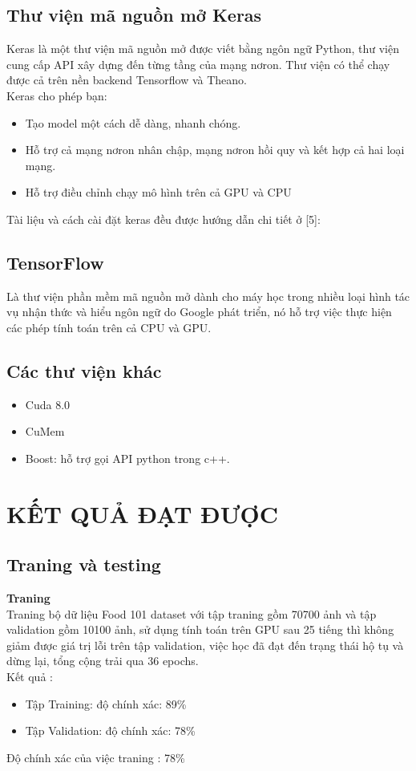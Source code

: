 \documentclass[13pt, a4paper]{extreport}
\begin{document}
\section{Thư viện mã nguồn mở Keras}
\indent Keras là một thư viện mã nguồn mở được viết bằng ngôn ngữ Python, thư viện cung cấp API xây dựng đến từng tầng của mạng nơron. Thư viện có thể chạy được cả trên nền backend Tensorflow và Theano.\\
\indent Keras cho phép bạn:
  \begin{itemize}
	\item Tạo model một cách dễ dàng, nhanh chóng.
	\item Hỗ trợ cả mạng nơron nhân chập, mạng nơron hồi quy và kết hợp cả hai loại mạng.
	\item Hỗ trợ điều chỉnh chạy mô hình trên cả GPU và CPU
  \end{itemize}
\indent Tài liệu và cách cài đặt keras đều được hướng dẫn chi tiết ở [5]:
\section{TensorFlow}
\indent Là thư viện phần mềm mã nguồn mở dành cho máy học trong nhiều loại hình tác vụ nhận thức và hiểu ngôn ngữ do Google phát triển, nó hỗ trợ việc thực hiện các phép tính toán trên cả CPU và GPU.
\section{Các thư viện khác}
  \begin{itemize}
  	\item Cuda 8.0 
  	\item CuMem
  	\item Boost: hỗ trợ gọi API python trong c++.
  \end{itemize}
\chapter{KẾT QUẢ ĐẠT ĐƯỢC}
\section {Traning và testing}
\indent \textbf{Traning}\\
\indent Traning bộ dữ liệu Food 101 dataset với tập traning gồm 70700 ảnh  và tập validation gồm 10100 ảnh, sử dụng tính toán trên GPU sau 25 tiếng thì không giảm được giá trị lỗi trên tập validation, việc học đã đạt đến trạng thái hộ tụ và dừng lại, tổng cộng trải qua 36 epochs.\\
\indent Kết quả :
\begin {itemize}
\item Tập Training: độ chính xác: 89\%
\item Tập Validation: độ chính xác: 78\%
\end{itemize}
\indent Độ chính xác của  việc traning : 78\%\\
\end{document}
